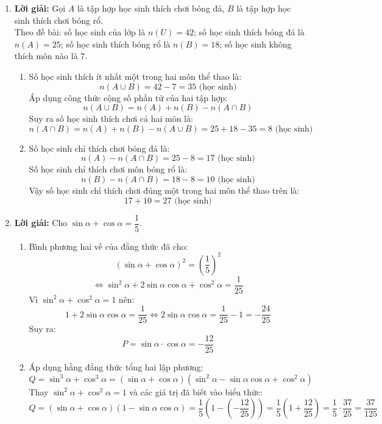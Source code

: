 \documentclass[12pt,a4paper]{article}
\begin{document}
\begin{enumerate}[resume]
\item \textbf{Lời giải:}
Gọi $A$ là tập hợp học sinh thích chơi bóng đá, $B$ là tập hợp học sinh thích chơi bóng rổ.\\
Theo đề bài: số học sinh của lớp là $n(U) = 42$; số học sinh thích bóng đá là $n(A) = 25$; số học sinh thích bóng rổ là $n(B) = 18$; số học sinh không thích môn nào là $7$.
\begin{enumerate}
    \item Số học sinh thích ít nhất một trong hai môn thể thao là:
    \[ n(A \cup B) = 42 - 7 = 35\text{ (học sinh)} \]
    Áp dụng công thức cộng số phần tử của hai tập hợp:
    \[ n(A \cup B) = n(A) + n(B) - n(A \cap B) \]
    Suy ra số học sinh thích chơi cả hai môn là:
    \[ n(A \cap B) = n(A) + n(B) - n(A \cup B) = 25 + 18 - 35 = 8\text{ (học sinh)} \]
    \item Số học sinh chỉ thích chơi bóng đá là:
    \[ n(A) - n(A \cap B) = 25 - 8 = 17\text{ (học sinh)} \]
    Số học sinh chỉ thích chơi môn bóng rổ là:
    \[ n(B) - n(A \cap B) = 18 - 8 = 10\text{ (học sinh)} \]
    Vậy số học sinh chỉ thích chơi đúng một trong hai môn thể thao trên là:
    \[ 17 + 10 = 27\text{ (học sinh)} \]
\end{enumerate}

\item \textbf{Lời giải:}
Cho $\sin \alpha + \cos \alpha = \dfrac{1}{5}$.
\begin{enumerate}
    \item Bình phương hai vế của đẳng thức đã cho:
    \[ (\sin \alpha + \cos \alpha)^2 = \left(\dfrac{1}{5}\right)^2 \]
    \[ \Leftrightarrow \sin^2 \alpha + 2\sin \alpha \cos \alpha + \cos^2 \alpha = \dfrac{1}{25} \]
    Vì $\sin^2 \alpha + \cos^2 \alpha = 1$ nên:
    \[ 1 + 2\sin \alpha \cos \alpha = \dfrac{1}{25} \Leftrightarrow 2\sin \alpha \cos \alpha = \dfrac{1}{25} - 1 = -\dfrac{24}{25} \]
    Suy ra:
    \[ P = \sin \alpha \cdot \cos \alpha = -\dfrac{12}{25} \]
    \item Áp dụng hằng đẳng thức tổng hai lập phương:
    \[ Q = \sin^3 \alpha + \cos^3 \alpha = (\sin \alpha + \cos \alpha)(\sin^2 \alpha - \sin \alpha \cos \alpha + \cos^2 \alpha) \]
    Thay $\sin^2 \alpha + \cos^2 \alpha = 1$ và các giá trị đã biết vào biểu thức:
    \[ Q = (\sin \alpha + \cos \alpha)(1 - \sin \alpha \cos \alpha) = \dfrac{1}{5} \left(1 - \left(-\dfrac{12}{25}\right)\right) = \dfrac{1}{5} \left(1 + \dfrac{12}{25}\right) = \dfrac{1}{5} \cdot \dfrac{37}{25} = \dfrac{37}{125} \]
\end{enumerate}


\end{enumerate}
\end{document}
